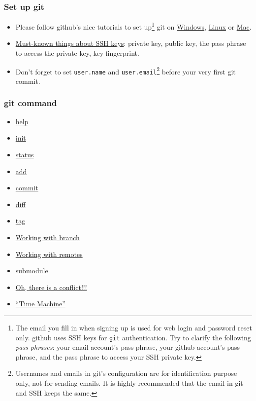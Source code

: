 \documentclass[11pt,ignorenonframetext,]{beamer}
\begin{document}
\begin{frame}[fragile]\frametitle{Set up git}

\begin{itemize}
\item
  Please follow github's nice tutorials to set up\footnote{The email you
    fill in when signing up is used for web login and password reset
    only. github uses SSH keys for \texttt{git} authentication. Try to
    clarify the following \emph{pass phrases}: your email account's pass
    phrase, your github account's pass phrase, and the pass phrase to
    access your SSH private key.} git on
  \href{http://help.github.com/win-set-up-git/}{Windows},
  \href{http://help.github.com/linux-set-up-git/}{Linux} or
  \href{http://help.github.com/mac-set-up-git/}{Mac}.
\item
  \href{http://linux.vbird.org/linux\_server/0310telnetssh.php\#ssh\_server}{Must-known
  things about SSH keys}: private key, public key, the pass phrase to
  access the private key, key fingerprint.
\item
  Don't forget to set \texttt{user.name} and
  \texttt{user.email}\footnote{Usernames and emails in git's
    configuration are for identification purpose only, not for sending
    emails. It is highly recommended that the email in git and SSH keeps
    the same.} before your very first git commit.
\end{itemize}
\end{frame}

\begin{frame}\frametitle{git command}

\begin{itemize}
	\item \hyperlink{githelp}{help}
	\item \hyperlink{gitinit}{init}
	\item \hyperlink{gitstatus}{status}
	\item \hyperlink{gitadd}{add}
	\item \hyperlink{gitcommit}{commit}
	\item \hyperlink{gitdiff}{diff}
	\item \hyperlink{gittag}{tag}
	\item \hyperlink{gitbranch}{Working with branch}
	\item \hyperlink{gitremote}{Working with remotes}
	\item \hyperlink{gitsub}{submodule}
	\item \hyperlink{giconflict}{Oh, there is a conflict!!!}
	\item \hyperlink{gittime}{``Time Machine''}
\end{itemize}
\end{frame}
\end{document}
